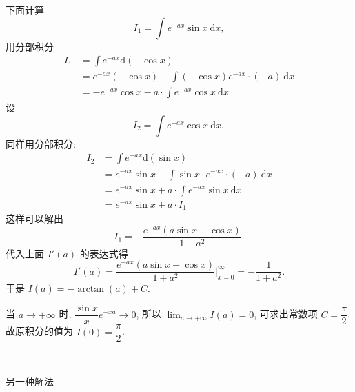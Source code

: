 下面计算 
\[I_1 = \int e^{-ax}\sin x\ \mathrm{d}x ,\]
用分部积分
\begin{align*}
I_1 &= \int e^{-ax}\mathrm{d}(-\cos x) \\
&= e^{-ax}(-\cos x) - \int(-\cos x)e^{-ax}\cdot(-a)\ \mathrm{d}x\\
&= -e^{-ax}\cos x - a\cdot\int e^{-ax}\cos x\ \mathrm{d}x
\end{align*}
设
\[I_2 = \int e^{-ax}\cos x\ \mathrm{d}x ,\]
同样用分部积分:
\begin{align*}
I_2 &= \int e^{-ax}\mathrm{d}(\sin x) \\
&= e^{-ax}\sin x - \int\sin x\cdot e^{-ax}\cdot(-a)\ \mathrm{d}x\\
&= e^{-ax}\sin x + a\cdot\int e^{-ax}\sin x\ \mathrm{d}x\\
&= e^{-ax}\sin x + a\cdot I_1
\end{align*}
这样可以解出 
\[I_1 = -\frac{e^{-ax}(a\sin x + \cos x)}{1+a^2} .\]
代入上面 $I'(a)$ 的表达式得
\[I'(a) = \frac{e^{-ax}(a\sin x + \cos x)}{1+a^2} \bigg|_{x=0}^\infty = -\frac{1}{1+a^2} .\]
于是 $I(a) = -\arctan(a) + C$. 

当 $a\to+\infty$ 时, $\dfrac{\sin x}{x}e^{-xa}\to 0$, 所以 $\displaystyle \lim_{a\to+\infty}I(a) = 0$, 可求出常数项 $C = \dfrac{\pi}{2}$. 故原积分的值为 $I(0) = \dfrac{\pi}{2}$. 

~

\noindent 另一种解法

